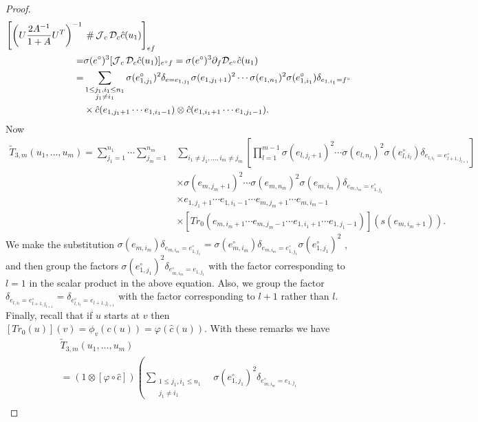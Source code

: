 \begin{proof}
\begin{align}
\left[\left(U\frac{2A^{-1}}{1+A} U^{T}\right)^{-1}\right.&\left. \vphantom{\left(U\frac{2A^{-1}}{1+A} U^{T}\right)^{-1}} \#\J_c\D_c \hat c(u_1)\right]_{ef}\nonumber\\
	=& \sigma(e^\circ)^3 [\J_c \D_c \hat c(u_1)]_{e^\circ f} = \sigma(e^\circ)^3 \partial_f \D_{e^\circ} \hat c(u_1) \label{front_term}\\
=& \sum_{\substack{1\leq j_1,i_1\leq n_1\\ j_1\neq i_1}} \sigma(e_{1,j_1}^\circ)^2 \delta_{e=e_{1,j_1}}\sigma(e_{1,j_1+1})^2\cdots \sigma(e_{1,n_1})^2 \sigma(e_{1,i_1}^\circ)\delta_{e_{1,i_1}=f^\circ} \nonumber\\
&\times \hat c(e_{1,j_1+1}\cdots e_{1,i_1-1})\otimes \hat c(e_{1,i_1+1}\cdots e_{1,j_1-1}).\nonumber
\end{align}
Now
\begin{align*}
	\tilde{T}_{3,m}(u_1,\ldots, u_m)= \sum_{j_1=1}^{n_1} \cdots \sum_{j_m=1}^{n_m}& \sum_{i_1\neq j_1,\ldots, i_m\neq j_m} \left[\prod_{l=1}^{m-1} \sigma(e_{l,j_l+1})^2\cdots\sigma(e_{l,n_l})^2 \sigma(e_{l,i_l}^\circ) \delta_{e_{l,i_l}=e_{l+1,j_{l+1}}^\circ} \right]\\
		&\times\sigma(e_{m,j_m+1})^2\cdots \sigma(e_{m,n_m})^2 \sigma(e_{m,i_m}) \delta_{e_{m,i_m}=e_{1,j_1}^\circ}\\
		&\times e_{1,j_1+1}\cdots e_{1,i_1-1}\cdots e_{m,j_m+1}\cdots e_{m,i_m-1}\\
		&\times \left[Tr_0(e_{m,i_m+1}\cdots e_{m,j_m-1} \cdots e_{1,i_1+1}\cdots e_{1,j_1-1})\right](s(e_{m,i_m+1})).
\end{align*}
We make the substitution $\sigma(e_{m,i_m})\delta_{e_{m,i_m}=e_{1,j_1}^\circ}=\sigma(e_{m,i_m}^\circ)\delta_{e_{m,i_m}=e_{1,j_1}^\circ}\sigma(e_{1,j_1}^\circ)^2$ , and then group the factors $\sigma(e_{1,j_1}^\circ)^2\delta_{e_{m,i_m}^\circ=e_{1,j_1}}$ with the factor corresponding to $l=1$ in the scalar product in the above equation. Also, we group the factor $\delta_{e_{l,i_l}=e_{l+1,j_{l+1}}^\circ}=\delta_{e_{l,i_l}^\circ=e_{l+1,j_{l+1}}}$ with the factor corresponding to $l+1$ rather than $l$. Finally, recall that if $u$ starts at $v$ then $[Tr_0(u)](v)=\phi_v(c(u))=\varphi(\hat{c}(u))$. With these remarks we have
	\begin{align*}
		\tilde{T}_{3,m}(u_1,\ldots, u_m)\qquad\qquad\ \ \ &\\
		=(1\otimes [\varphi\circ\hat{c}])\left( \sum_{\substack{1\leq j_1,i_1\leq n_1\\ j_1\neq i_1}}\right. &\sigma(e_{1,j_1}^\circ)^2 \delta_{e_{m,i_m}^\circ=e_{1,j_1}}\\

\end{align*}
\end{proof}
